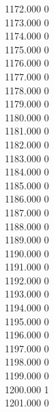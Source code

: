{ 1172.000	0 \\
 1173.000	0 \\
 1174.000	0 \\
 1175.000	0 \\
 1176.000	0 \\
 1177.000	0 \\
 1178.000	0 \\
 1179.000	0 \\
 1180.000	0 \\
 1181.000	0 \\
 1182.000	0 \\
 1183.000	0 \\
 1184.000	0 \\
 1185.000	0 \\
 1186.000	0 \\
 1187.000	0 \\
 1188.000	0 \\
 1189.000	0 \\
 1190.000	0 \\
 1191.000	0 \\
 1192.000	0 \\
 1193.000	0 \\
 1194.000	0 \\
 1195.000	0 \\
 1196.000	0 \\
 1197.000	0 \\
 1198.000	0 \\
 1199.000	0 \\
 1200.000	1 \\
 1201.000	0 \\
}
